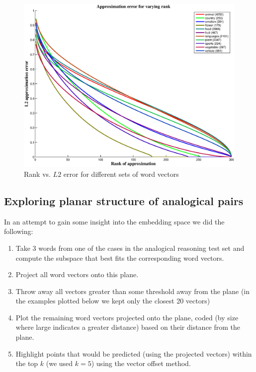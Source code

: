 \documentclass[11pt]{article}
\begin{document}
\begin{figure}[t]
\centering
\includegraphics[width=.65\textwidth]{./images/svd_per_class.eps}
\caption{Rank vs. $L2$ error for different sets of word vectors}
\label{fig:svdOnClass}
\end{figure}

\subsection{Exploring planar structure of analogical pairs}
In an attempt to gain some insight into the embedding space we did the following: 
\begin{enumerate}
  \item Take 3 words from one of the cases in the analogical reasoning test set and compute the subspace that best fits the corresponding word vectors.
  \item Project all word vectors onto this plane.
  \item Throw away all vectors greater than some threshold away from the plane (in the examples plotted below we kept only the closest 20 vectors)
  \item Plot the remaining word vectors projected onto the plane, coded (by size where large indicates a greater distance) based on their distance from the plane. 
  \item Highlight points that would be predicted (using the projected vectors) within the top $k$ (we used $k = 5$) using the vector offset method.
\end{enumerate}
\end{document}
